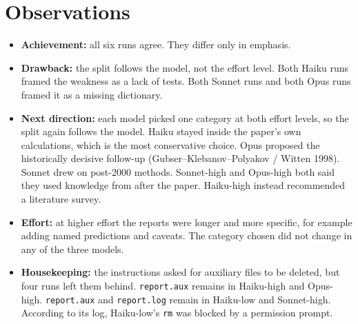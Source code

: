 \documentclass[11pt]{article}
\begin{document}
\section*{Observations}
\begin{itemize}
\item \textbf{Achievement:} all six runs agree. They differ only in emphasis.
\item \textbf{Drawback:} the split follows the model, not the effort level. Both Haiku runs framed the weakness as a lack of tests. Both Sonnet runs and both Opus runs framed it as a missing dictionary.
\item \textbf{Next direction:} each model picked one category at both effort levels, so the split again follows the model. Haiku stayed inside the paper's own calculations, which is the most conservative choice. Opus proposed the historically decisive follow-up (Gubser--Klebanov--Polyakov / Witten 1998). Sonnet drew on post-2000 methods. Sonnet-high and Opus-high both said they used knowledge from after the paper. Haiku-high instead recommended a literature survey.
\item \textbf{Effort:} at higher effort the reports were longer and more specific, for example adding named predictions and caveats. The category chosen did not change in any of the three models.
\item \textbf{Housekeeping:} the instructions asked for auxiliary files to be deleted, but four runs left them behind. \texttt{report.aux} remains in Haiku-high and Opus-high. \texttt{report.aux} and \texttt{report.log} remain in Haiku-low and Sonnet-high. According to its log, Haiku-low's \texttt{rm} was blocked by a permission prompt.
\end{itemize}
\end{document}

